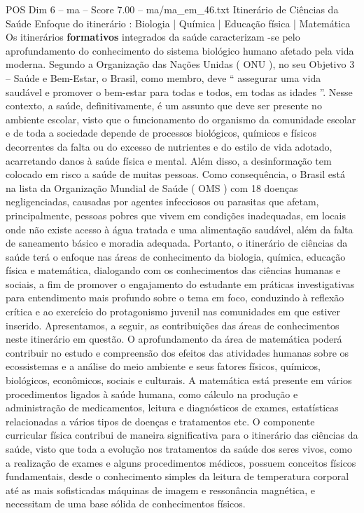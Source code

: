 \begin{textsample}{POS Dim 6 – ma – Score 7.00 – ma/ma\_em\_46.txt}  \label{ex:f6_pos_099}
Itinerário de Ciências da Saúde Enfoque do itinerário : Biologia | Química | Educação física | Matemática Os itinerários \textbf{formativos} integrados da saúde caracterizam -se pelo aprofundamento do conhecimento do sistema biológico humano afetado pela vida moderna.
Segundo a Organização das Nações Unidas ( ONU ), no seu Objetivo 3 – Saúde e Bem-Estar, o Brasil, como membro, deve “ assegurar uma vida saudável e promover o bem-estar para todas e todos, em todas as idades ”.
Nesse contexto, a saúde, definitivamente, é um assunto que deve ser presente no ambiente escolar, visto que o funcionamento do organismo da comunidade escolar e de toda a sociedade depende de processos biológicos, químicos e físicos decorrentes da falta ou do excesso de nutrientes e do estilo de vida adotado, acarretando danos à saúde física e mental.
Além disso, a desinformação tem colocado em risco a saúde de muitas pessoas.
Como consequência, o Brasil está na lista da Organização Mundial de Saúde ( OMS ) com 18 doenças negligenciadas, causadas por agentes infecciosos ou parasitas que afetam, principalmente, pessoas pobres que vivem em condições inadequadas, em locais onde não existe acesso à água tratada e uma alimentação saudável, além da falta de saneamento básico e moradia adequada.
Portanto, o itinerário de ciências da saúde terá o enfoque nas áreas de conhecimento da biologia, química, educação física e matemática, dialogando com os conhecimentos das ciências humanas e sociais, a fim de promover o engajamento do estudante em práticas investigativas para entendimento mais profundo sobre o tema em foco, conduzindo à reflexão crítica e ao exercício do protagonismo juvenil nas comunidades em que estiver inserido.
Apresentamos, a seguir, as contribuições das áreas de conhecimentos neste itinerário em questão.
O aprofundamento da área de matemática poderá contribuir no estudo e compreensão dos efeitos das atividades humanas sobre os ecossistemas e a análise do meio ambiente e seus fatores físicos, químicos, biológicos, econômicos, sociais e culturais.
A matemática está presente em vários procedimentos ligados à saúde humana, como cálculo na produção e administração de medicamentos, leitura e diagnósticos de exames, estatísticas relacionadas a vários tipos de doenças e tratamentos etc.
O componente curricular física contribui de maneira significativa para o itinerário das ciências da saúde, visto que toda a evolução nos tratamentos da saúde dos seres vivos, como a realização de exames e alguns procedimentos médicos, possuem conceitos físicos fundamentais, desde o conhecimento simples da leitura de temperatura corporal até as mais sofisticadas máquinas de imagem e ressonância magnética, e necessitam de uma base sólida de conhecimentos físicos.

\end{textsample}
